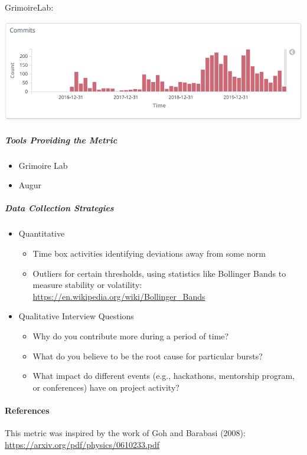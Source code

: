 GrimoireLab:

\includegraphics{images/burstiness_gl.png}

\hypertarget{tools-providing-the-metric}{%
\subparagraph{Tools Providing the
Metric}\label{tools-providing-the-metric}}

\begin{itemize}
\tightlist
\item
  Grimoire Lab
\item
  Augur
\end{itemize}

\hypertarget{data-collection-strategies}{%
\subparagraph{Data Collection
Strategies}\label{data-collection-strategies}}

\begin{itemize}
\item
  Quantitative

  \begin{itemize}
  \tightlist
  \item
    Time box activities identifying deviations away from some norm
  \item
    Outliers for certain thresholds, using statistics like Bollinger
    Bands to measure stability or volatility:
    \href{https://en.wikipedia.org/wiki/Bollinger_Bands}{https://en.wikipedia.org/wiki/Bollinger\_Bands}
  \end{itemize}
\item
  Qualitative Interview Questions

  \begin{itemize}
  \tightlist
  \item
    Why do you contribute more during a period of time?
  \item
    What do you believe to be the root cause for particular bursts?
  \item
    What impact do different events (e.g., hackathons, mentorship
    program, or conferences) have on project activity?
  \end{itemize}
\end{itemize}

\hypertarget{references}{%
\paragraph{References}\label{references}}

This metric was inspired by the work of Goh and Barabasi (2008):
\href{https://arxiv.org/pdf/physics/0610233.pdf}{https://arxiv.org/pdf/physics/0610233.pdf}
